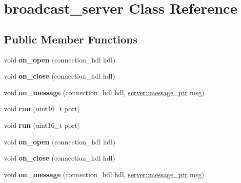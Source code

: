 \hypertarget{classbroadcast__server}{}\section{broadcast\+\_\+server Class Reference}
\label{classbroadcast__server}
\subsection*{Public Member Functions}
\begin{DoxyCompactItemize}
\item 
\mbox{\label{classbroadcast__server_a20d3e5b15b9e916f6772d3e1137327c0}} 
void {\bfseries on\+\_\+open} (connection\+\_\+hdl hdl)
\item 
\mbox{\label{classbroadcast__server_aba6fc18682e45978ae64ed1667deb44e}} 
void {\bfseries on\+\_\+close} (connection\+\_\+hdl hdl)
\item 
\mbox{\label{classbroadcast__server_aa56cb8528f19afc3b1a2712d07d0b499}} 
void {\bfseries on\+\_\+message} (connection\+\_\+hdl hdl, \mbox{\hyperlink{classwebsocketpp_1_1endpoint_a585ecbbfd9689d4e4229e4c8378bd672}{server\+::message\+\_\+ptr}} msg)
\item 
\mbox{\label{classbroadcast__server_af7c28eeb788bf2451364e76a02615cac}} 
void {\bfseries run} (uint16\+\_\+t port)
\item 
\mbox{\label{classbroadcast__server_af7c28eeb788bf2451364e76a02615cac}} 
void {\bfseries run} (uint16\+\_\+t port)
\item 
\mbox{\label{classbroadcast__server_a20d3e5b15b9e916f6772d3e1137327c0}} 
void {\bfseries on\+\_\+open} (connection\+\_\+hdl hdl)
\item 
\mbox{\label{classbroadcast__server_aba6fc18682e45978ae64ed1667deb44e}} 
void {\bfseries on\+\_\+close} (connection\+\_\+hdl hdl)
\item 
\mbox{\label{classbroadcast__server_aa56cb8528f19afc3b1a2712d07d0b499}} 
void {\bfseries on\+\_\+message} (connection\+\_\+hdl hdl, \mbox{\hyperlink{classwebsocketpp_1_1endpoint_a585ecbbfd9689d4e4229e4c8378bd672}{server\+::message\+\_\+ptr}} msg)

\end{DoxyCompactItemize}
